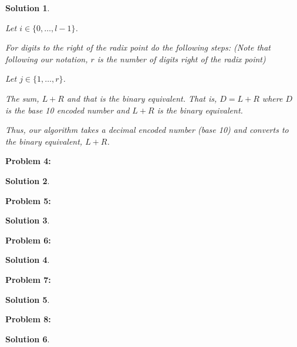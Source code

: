 \documentclass[12pt, letterpaper]{article}
\theoremstyle{nonumberplain}
\newtheorem{sol}{Solution}
\begin{document}
\begin{sol}
\begin{enumerate}[label=\alph*)]
		      Let $i\in \{0, \ldots, l-1\}$.

		      For digits to the right of the radix point do the following steps: (Note that following our notation, $r$ is the number of digits right of the radix point)

		      Let $j\in \{1, \ldots, r\}$.

		      The sum, $L+R$ and that is the binary equivalent. That is, $D = L+R$ where $D$ is the base 10 encoded number and $L+R$ is the binary equivalent.

		      Thus, our algorithm takes a decimal encoded number (base 10) and converts to the binary equivalent, $L+R$.



	\end{enumerate}
\end{sol}

\hspace{18pt}\textbf{Problem 4:} \medskip
\begin{sol}

\end{sol}

\hspace{18pt}\textbf{Problem 5:} \medskip
\begin{sol}

\end{sol}

\hspace{18pt}\textbf{Problem 6:} \medskip
\begin{sol}

\end{sol}

\hspace{18pt}\textbf{Problem 7:} \medskip
\begin{sol}

\end{sol}

\hspace{18pt}\textbf{Problem 8:} \medskip
\begin{sol}

\end{sol}
\end{document}
